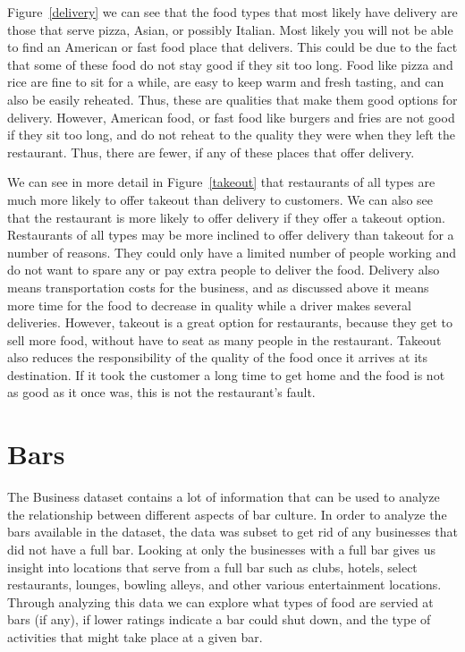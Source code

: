 \documentclass[11pt]{article}
\begin{document}
Figure~\ref{delivery} we can see that the food types that most likely have delivery are those that serve pizza, Asian, or possibly Italian.  Most likely you will not be able to find an American or fast food place that delivers.  This could be due to the fact that some of these food do not stay good if they sit too long.  Food like pizza and rice are fine to sit for a while,  are easy to keep warm and fresh tasting, and can also be easily reheated. Thus, these are qualities that make them good options for delivery.  However, American food, or fast food like burgers and fries are not good if they sit too long, and do not reheat to the quality they were when they left the restaurant.  Thus, there are fewer, if any of these places that offer delivery.

We can see in more detail in Figure~\ref{takeout} that restaurants of all types are much more likely to offer takeout than delivery to customers.  We can also see that the restaurant is more likely to offer delivery if they offer a takeout option.  Restaurants of all types may be more inclined to offer delivery than takeout for a number of reasons.  They could only have a limited number of people working and do not want to spare any or pay extra people to deliver the food.  Delivery also means transportation costs for the business, and as discussed above it means more time for the food to decrease in quality while a driver makes several deliveries.  However, takeout is a great option for restaurants, because they get to sell more food, without have to seat as many people in the restaurant.  Takeout also reduces the responsibility of the quality of the food once it arrives at its destination.  If it took the customer a long time to get home and the food is not as good as it once was, this is not the restaurant's fault.  



\section{Bars}

The Business dataset contains a lot of information that can be used to analyze the relationship between different aspects of bar culture.  In order to analyze the bars available in the dataset, the data was subset to get rid of any businesses that did not have a full bar.  Looking at only the businesses with a full bar gives us insight into locations that serve from a full bar such as clubs, hotels, select restaurants, lounges, bowling alleys, and other various entertainment locations.  Through analyzing this data we can explore what types of food are servied at bars (if any), if lower ratings indicate a bar could shut down, and the type of activities that might take place at a given bar.
\end{document}
